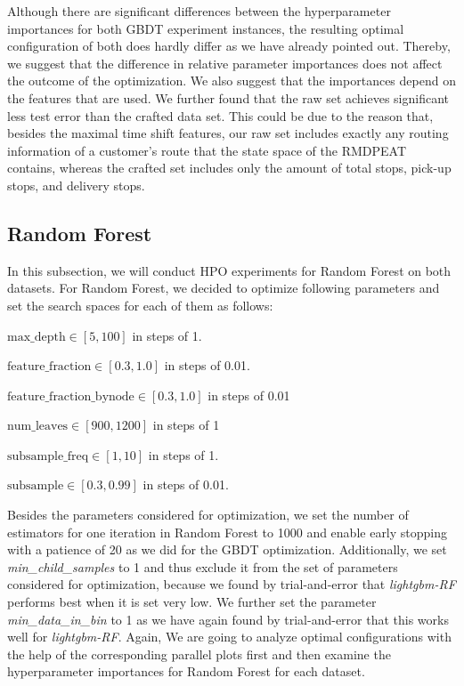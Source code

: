Although there are significant differences between the hyperparameter importances for both GBDT experiment instances, the resulting optimal configuration of both does hardly differ as we have already pointed out. Thereby, we suggest that the difference in relative parameter importances does not affect the outcome of the optimization. We also suggest that the importances depend on the features that are used. We further found that the raw set achieves significant less test error than the crafted data set. This could be due to the reason that, besides the maximal time shift features, our raw set includes exactly any routing information of a customer's route that the state space of the RMDPEAT contains, whereas the crafted set includes only the amount of total stops, pick-up stops, and delivery stops. 
\clearpage
\subsection{Random Forest}
In this subsection, we will conduct HPO experiments for Random Forest on both datasets. 
For Random Forest, we decided to optimize following parameters and set the search spaces for each of them as follows:
\begin{description}[font=$\bullet$\scshape\bfseries]
	\item $ \text{max\_depth} \in [5, 100] $ in steps of 1.
	\item $ \text{feature\_fraction} \in [0.3, 1.0] $ in steps of 0.01.
	\item $ \text{feature\_fraction\_bynode} \in [0.3, 1.0] $ in steps of 0.01
	\item $ \text{num\_leaves} \in [900, 1200] $ in steps of 1
	\item $ \text{subsample\_freq} \in [1, 10] $ in steps of 1.
	\item $ \text{subsample} \in [0.3, 0.99] $ in steps of 0.01.
\end{description}
Besides the parameters considered for optimization, we set the number of estimators for one iteration in Random Forest to 1000 and enable early stopping with a patience of 20 as we did for the GBDT optimization. Additionally, we set \textit{min\_child\_samples} to 1 and thus exclude it from the set of parameters considered for optimization, because we found by trial-and-error that \textit{lightgbm-RF} performs best when it is set very low. We further set the parameter \textit{min\_data\_in\_bin} to 1 as we have again found by trial-and-error that this works well for \textit{lightgbm-RF}. Again, We are going to analyze optimal configurations with the help of the corresponding parallel plots first and then examine the hyperparameter importances for Random Forest for each dataset. 

